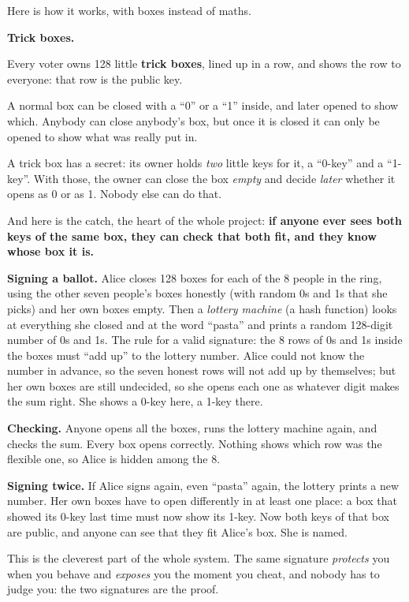 \documentclass[11pt,a4paper]{article}
\newenvironment{aside}[1][Aside]{%
  \def\FrameCommand{\fboxsep=8pt\fcolorbox{boxrule}{boxbg}}%
  \MakeFramed{\advance\hsize-2\fboxsep\FrameRestore}%
  \noindent\textbf{#1.}\par\smallskip%
}{\endMakeFramed}
\begin{document}
Here is how it works, with boxes instead of maths.

\begin{aside}[Trick boxes]
Every voter owns 128 little \textbf{trick boxes}, lined up in a row, and
shows the row to everyone: that row is the public key.

\medskip
A normal box can be closed with a ``0'' or a ``1'' inside, and later
opened to show which. Anybody can close anybody's box, but once it is
closed it can only be opened to show what was really put in.

\medskip
A trick box has a secret: its owner holds \emph{two} little keys for it, a
``0-key'' and a ``1-key''. With those, the owner can close the box
\emph{empty} and decide \emph{later} whether it opens as 0 or as 1. Nobody
else can do that.

\medskip
And here is the catch, the heart of the whole project: \textbf{if anyone
ever sees both keys of the same box, they can check that both fit, and
they know whose box it is.}
\end{aside}

\textbf{Signing a ballot.} Alice closes 128 boxes for each of the 8 people
in the ring, using the other seven people's boxes honestly (with random 0s
and 1s that she picks) and her own boxes empty. Then a \emph{lottery
machine} (a hash function) looks at everything she closed and at the word
``pasta'' and prints a random 128-digit number of 0s and 1s. The rule for a
valid signature: the 8 rows of 0s and 1s inside the boxes must ``add up''
to the lottery number. Alice could not know the number in advance, so the
seven honest rows will not add up by themselves; but her own boxes are
still undecided, so she opens each one as whatever digit makes the sum
right. She shows a 0-key here, a 1-key there.

\textbf{Checking.} Anyone opens all the boxes, runs the lottery machine
again, and checks the sum. Every box opens correctly. Nothing shows which
row was the flexible one, so Alice is hidden among the 8.

\textbf{Signing twice.} If Alice signs again, even ``pasta'' again, the
lottery prints a new number. Her own boxes have to open differently in at
least one place: a box that showed its 0-key last time must now show its
1-key. Now both keys of that box are public, and anyone can see that they
fit Alice's box. She is named.

This is the cleverest part of the whole system. The same signature
\emph{protects} you when you behave and \emph{exposes} you the moment you
cheat, and nobody has to judge you: the two signatures are the proof.
\end{document}
